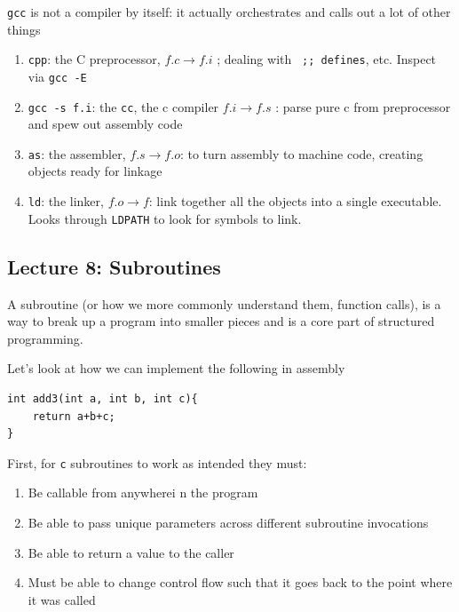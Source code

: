 \documentclass[../notes.tex]{subfiles}
\begin{document}
\begin{blockquote}
	\texttt{gcc} is not a compiler by itself: it actually orchestrates and calls out a lot of other things

	\begin{enumerate}
	\item \texttt{cpp}: the C preprocessor, $    f.c \to  f.i $  ; dealing with \texttt{\  ;; defines}, etc. Inspect via \texttt{gcc -E} 
	\item \texttt{gcc -s f.i}: the \texttt{cc}, the c compiler $ f.i \to f.s $  : parse pure c from preprocessor and spew out assembly code
	\item \texttt{as}: the assembler, $ f.s \to f.o $:   to turn assembly to machine code, creating objects ready for linkage
	\item \texttt{ld}: the linker, $ f.o \to f $:  link together all the objects into a single executable. Looks through \texttt{LDPATH} to look for symbols to link. 
	\end{enumerate}
\end{blockquote}



\subsection{Lecture 8: Subroutines}

A subroutine (or how we more commonly understand them, function calls), is a way to break up a program into smaller pieces and is a core part of structured programming.

Let's look at how we can implement the following in assembly

\begin{listing}[H]
\begin{verbatim}
int add3(int a, int b, int c){
	return a+b+c;
}
\end{verbatim}
\end{listing}

First, for \texttt{c}  subroutines to work as intended they must:

\begin{enumerate}
	\item Be callable from anywherei n the program
	\item Be able to pass unique parameters across different subroutine invocations
	\item Be able to return a value to the caller
	\item Must be able to change control flow such that it goes back to the point where it was called
\end{enumerate}
\end{document}
